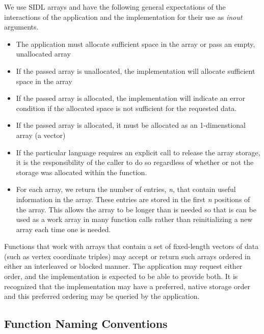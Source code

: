 \documentclass{article}
\begin{document}
We use SIDL arrays and have the following general expectations 
of the interactions of the application and the implementation 
for their use as \emph{inout} arguments.
\begin{itemize}
\item  The application must allocate sufficient space in the array or 
pass an empty, unallocated array
\item  If the passed array is unallocated, the implementation will allocate 
sufficient space in the array
\item  If the passed array is allocated, the implementation will indicate 
an error condition if the allocated space is not sufficient for 
the requested data.
\item  If the passed array is allocated, it must be allocated as an 1-dimenstional 
array (a vector)
\item  If the particular language requires an explicit call to release 
the array storage, it is the responsibility of the caller to 
do so regardless of whether or not the storage was allocated 
within the function.
\item  For each array, we return the number of entries, \emph{n}, that 
contain useful information in the array. These entries are stored 
in the first \emph{n} positions of the array. This allows the array 
to be longer than is needed so that is can be used as a work 
array in many function calls rather than reinitializing a new 
array each time one is needed.
\end{itemize}


Functions that work with arrays that contain a set of fixed-length 
vectors of data (such as vertex coordinate triples) may accept 
or return such arrays ordered in either an interleaved or blocked 
manner. The application may request either order, and the implementation 
is expected to be able to provide both. It is recognized that 
the implementation may have a preferred, native storage order 
and this preferred ordering may be queried by the application.


\subsection{Function Naming Conventions}
\end{document}
